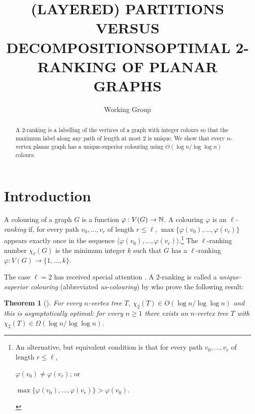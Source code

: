 \documentclass[kpfonts]{patmorin}
\title{\MakeUppercase{(Layered) Partitions versus Decompositions}}
\author{}
\title{\MakeUppercase{Optimal 2-Ranking of Planar Graphs}}
\author{Working Group}
\newcommand{\uqs}{\chi_2}
\newtheorem{othertheorem}{Theorem}
\begin{document}
\maketitle

\begin{abstract}
  A 2-ranking is a labelling of the vertices of a graph with integer colours so that the maximum label along any path of length at most 2 is unique.  We show that every $n$-vertex planar graph has a unique-superior colouring using $O(\log n/\log\log n)$ colours.
\end{abstract}



\section{Introduction}


A colouring of a graph $G$ is a function $\varphi:V(G)\to \mathbb{N}$.  A colouring $\varphi$ is an \emph{$\ell$-ranking} if, for every path $v_0,\ldots,v_r$ of length $r\le\ell$, $\max\{\varphi(v_0),\ldots,\varphi(v_r)\}$ appears exactly once in the sequence $\langle \varphi(v_0),\ldots,\varphi(v_r)\rangle$.\footnote{An alternative, but equivalent condition is that for every path $v_0,\ldots,v_r$ of length $r\le\ell$,
\begin{inparaenum}[(i)]
   \item $\varphi(v_0)\neq \varphi(v_r)$; or
   \item $\max\{\varphi(v_0),\ldots,\varphi(v_r)\} > \varphi(v_0)$.
\end{inparaenum}
}
The $\ell$-ranking number $\chi_\ell(G)$ is the minimum integer $k$ such that $G$ has a $\ell$-ranking $\varphi:V(G)\to \{1,\ldots,k\}$.

The case $\ell=2$ has received special attention \cite{almeter.demircan.ea:graph,karpas.neiman.ea:on}. A $2$-ranking is called a \emph{unique-superior colouring} (abbreviated \emph{us-colouring}) by \citet{karpas.neiman.ea:on} who prove the following result:

\setcounter{othertheorem}{19}
\begin{othertheorem}[\cite{karpas.neiman.ea:on}]\label{trees}
    For every $n$-vertex tree $T$, $\uqs(T)\in O(\log n/\log\log n)$ and this is asymptotically optimal: for every $n\ge 1$ there exists an $n$-vertex tree $T$ with $\uqs(T)\in\Omega(\log n/\log\log n)$.
\end{othertheorem}
\end{document}
